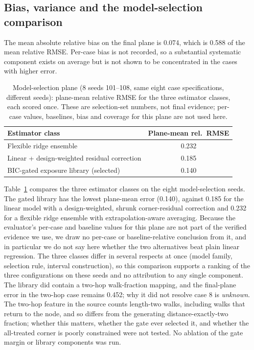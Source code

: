 \documentclass{article}
\begin{document}
\subsection{Bias, variance and the model-selection comparison}
The mean absolute relative bias on the final plane is 0.074, %
 which is 0.588 of the mean relative RMSE. %
 Per-case bias is not recorded, so a substantial systematic component exists on average but is not shown to be concentrated in the cases with higher error.

\begin{table}[t]
\centering\small
\caption{Model-selection plane (8 seeds 101--108, same eight case specifications, different seeds): plane-mean relative RMSE for the three estimator classes, each scored once. These are selection-set numbers, not final evidence; per-case values, baselines, bias and coverage for this plane are not used here.}
\label{tab:search}
\begin{tabular}{lc}
\toprule
Estimator class & Plane-mean rel.\ RMSE\\
\midrule
Flexible ridge ensemble & 0.232\\ %
Linear + design-weighted residual correction & 0.185\\ %
BIC-gated exposure library (selected) & 0.140\\ %
\bottomrule
\end{tabular}
\end{table}

Table~\ref{tab:search} compares the three estimator classes on the eight model-selection seeds. The gated library has the lowest plane-mean error (0.140), against 0.185 for the linear model with a design-weighted, shrunk corner-residual correction and 0.232 for a flexible ridge ensemble with extrapolation-aware averaging. Because the evaluator's per-case and baseline values for this plane are not part of the verified evidence we use, we draw no per-case or baseline-relative conclusion from it, and in particular we do not say here whether the two alternatives beat plain linear regression. The three classes differ in several respects at once (model family, selection rule, interval construction), so this comparison supports a ranking of the three configurations on these seeds and no attribution to any single component. The library did contain a two-hop walk-fraction mapping, and the final-plane error in the two-hop case remains 0.452; why it did not resolve case 8 is \emph{unknown}. The two-hop feature in the source counts length-two walks, including walks that return to the node, and so differs from the generating distance-exactly-two fraction; whether this matters, whether the gate ever selected it, and whether the all-treated corner is poorly constrained were not tested. No ablation of the gate margin or library components was run.
\end{document}

